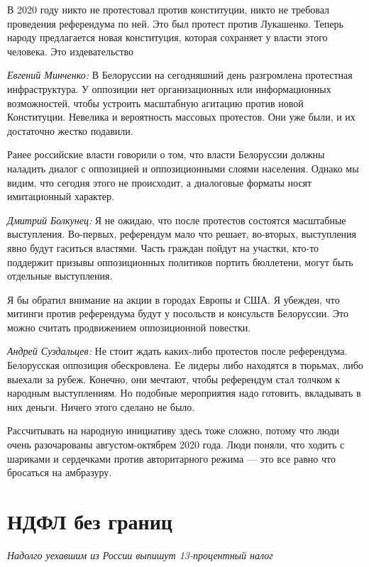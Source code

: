 \begin{fancyquotes}
    В 2020 году никто не протестовал против конституции, никто не требовал проведения референдума по ней. Это был протест против Лукашенко. Теперь народу предлагается новая конституция, которая сохраняет у власти этого человека. Это издевательство
\end{fancyquotes}

\textit{Евгений Минченко:} В Белоруссии на сегодняшний день разгромлена протестная инфраструктура. У оппозиции нет организационных или информационных возможностей, чтобы устроить масштабную агитацию против новой Конституции. Невелика и вероятность массовых протестов. Они уже были, и их достаточно жестко подавили.

Ранее российские власти говорили о том, что власти Белоруссии должны наладить диалог с оппозицией и оппозиционными слоями населения. Однако мы видим, что сегодня этого не происходит, а диалоговые форматы носят имитационный характер.

\textit{Дмитрий Болкунец:} Я не ожидаю, что после протестов состоятся масштабные выступления. Во-первых, референдум мало что решает, во-вторых, выступления явно будут гаситься властями. Часть граждан пойдут на участки, кто-то поддержит призывы оппозиционных политиков портить бюллетени, могут быть отдельные выступления.

Я бы обратил внимание на акции в городах Европы и США. Я убежден, что митинги против референдума будут у посольств и консульств Белоруссии. Это можно считать продвижением оппозиционной повестки.

\textit{Андрей Суздальцев:} Не стоит ждать каких-либо протестов после референдума. Белорусская оппозиция обескровлена. Ее лидеры либо находятся в тюрьмах, либо выехали за рубеж. Конечно, они мечтают, чтобы референдум стал толчком к народным выступлениям. Но подобные мероприятия надо готовить, вкладывать в них деньги. Ничего этого сделано не было.

Рассчитывать на народную инициативу здесь тоже сложно, потому что люди очень разочарованы августом-октябрем 2020 года. Люди поняли, что ходить с шариками и сердечками против авторитарного режима — это все равно что бросаться на амбразуру.

\newpage
\section{НДФЛ без границ}
\textit{Надолго уехавшим из России выпишут 13-процентный налог}

